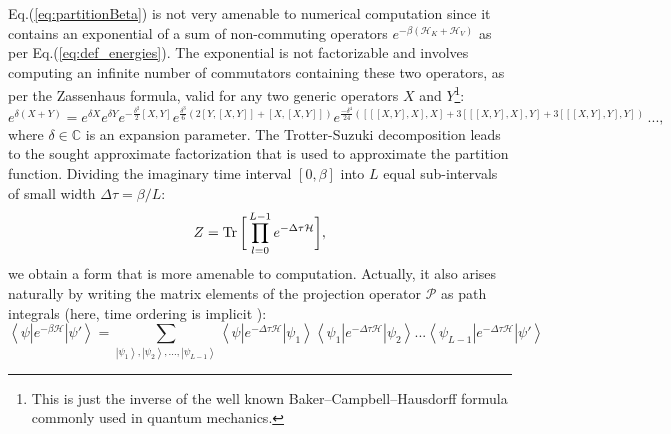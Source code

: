 Eq.(\ref{eq:partitionBeta}) is not very amenable to numerical computation since it contains an exponential of a sum of non-commuting operators $e^{-\beta (\mathcal{H}_K + \mathcal{H}_V)}$ as per Eq.(\ref{eq:def_energies}). 
The exponential is not factorizable and involves computing an infinite number of commutators containing these two operators, as per the Zassenhaus formula, valid for any two generic operators $X$ and $Y$\footnote{This is just the inverse of the well known Baker–Campbell–Hausdorff formula commonly used in quantum mechanics.}:
\begin{equation}\label{eq:zassenhaus}
e^{\delta (X+Y)}=e^{\delta X} e^{\delta Y} e^{-{\frac {\delta^{2}}{2}}[X,Y]} e^{{\frac {\delta^{3}}{6}}(2[Y,[X,Y]]+[X,[X,Y]])}  e^{{\frac {-\delta^{4}}{24}}([[[X,Y],X],X]+3[[[X,Y],X],Y]+3[[[X,Y],Y],Y])} \, ... , 
\end{equation}
where $\delta \in \mathbb{C}$ is an expansion parameter.
The Trotter-Suzuki decomposition leads to the sought approximate factorization that is used to approximate the partition function.
Dividing the imaginary time interval $[0, \beta ]$ into $L$ equal sub-intervals of small width $\Delta \tau = \beta / L$:
\begin{equation}\label{eq:partBreak}
Z =  \operatorname{Tr} \bigg[ \prod_{l=0}^{L-1} e^{-\Delta\tau \mathcal{H} } \bigg] ,
\end{equation}
we obtain a form that is more amenable to computation.
Actually, it also arises naturally by writing the matrix elements of the projection operator $\mathcal{P}$ as path integrals (here, time ordering is implicit \cite{hirsch_discrete_1983}):
\begin{equation}
\left\langle \psi | e^{-\beta \mathcal{H} } | \psi' \right\rangle = \sum_{\left| \psi_1 \right\rangle, \left| \psi_2 \right\rangle,..., \left| \psi_{L-1} \right\rangle }  \left\langle \psi | e^{-\Delta \tau \mathcal{H} } | \psi_1 \right\rangle \left\langle \psi_1 | e^{-\Delta \tau \mathcal{H} } | \psi_2 \right\rangle ... \left\langle \psi_{L - 1} | e^{-\Delta \tau \mathcal{H} } | \psi' \right\rangle 
\end{equation}

